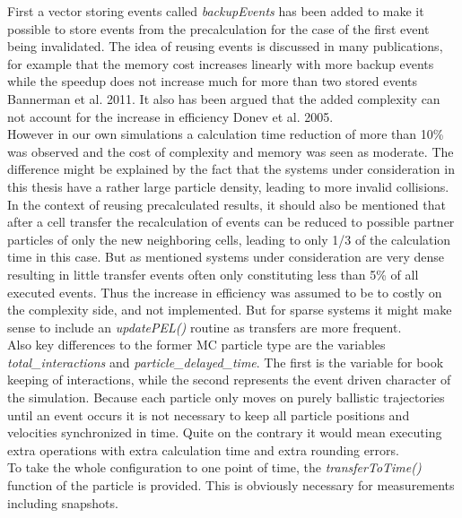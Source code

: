 First a vector storing events called \textit{backupEvents} has been added to make it possible to store events from the precalculation for the case of the first event being invalidated. The idea of reusing events is discussed in many publications, for example that the memory cost increases linearly with more backup events while the speedup does not increase much for more than two stored events Bannerman et al. 2011\cite{Bannerman2011}. It also has been argued that the added complexity can not account for the increase in efficiency Donev et al. 2005\cite{DONEV2005}.\\ 
However in our own simulations a calculation time reduction of more than 10\% was observed and the cost of complexity and memory was seen as moderate. The difference might be explained by the fact that the systems under consideration in this thesis have a rather large particle density, leading to more invalid collisions.\\

In the context of reusing precalculated results, it should also be mentioned that after a cell transfer the recalculation of events can be reduced to possible partner particles of only the new neighboring cells, leading to only 1/3 of the calculation time in this case. But as mentioned systems under consideration are very dense resulting in little transfer events often only constituting less than 5\% of all executed events. Thus the increase in efficiency was assumed to be to costly on the complexity side, and not implemented. But for sparse systems it might make sense to include an \textit{updatePEL()} routine as transfers are more frequent.\\

Also key differences to the former MC particle type are the variables \textit{total\_interactions} and \textit{particle\_delayed\_time}. The first is the variable for book keeping of interactions, while the second represents the event driven character of the simulation. Because each particle only moves on purely ballistic trajectories until an event occurs it is not necessary to keep all particle positions and velocities synchronized in time. Quite on the contrary it would mean executing extra operations with extra calculation time and extra rounding errors.\\
To take the whole configuration to one point of time, the \textit{transferToTime()} function of the particle is provided. This is obviously necessary for measurements including snapshots.\\

